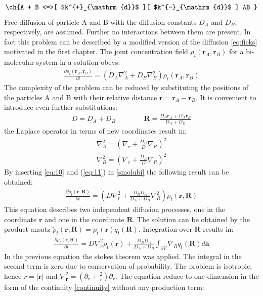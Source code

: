 \documentclass[
  a4paper,BCOR10mm,oneside,
  headsepline,footsepline,%
  fleqn,openbib
]{scrbook}
\begin{document}
\begin{align}\label{reactionscemebi}
\text{\ch{A + B <=>[ $k^{+}_{\mathrm{d}}$ ][ $k^{-}_{\mathrm{d}}$ ] AB }}
\end{align}
Free diffusion of particle A and B with the diffusion constants $D_A$ and $D_B$, respectively, are assumed. Further no interactions between them are present. In fact this problem can be described by a modified version of the diffusion \cref{eq:ficks} motivated in the first chapter.
The joint concentration field $\rho_t(\bm{r}_A,\bm{r}_B)$ for a bi-molecular system in a solution obeys:
\begin{align}
 \frac{\partial \rho_t(\bm{r}_A,\bm{r}_B)}{\partial t}=(D_A \nabla^{2}_{A}+D_B \nabla^{2}_{B}) \rho_t(\bm{r}_A,\bm{r}_B) \label{smolubi}
\end{align}
The complexity of the problem can be reduced by substituting the positions of the particles A and B with their relative distance $\bm{r}=\bm{r}_A-\bm{r}_B$. It is convenient to introduce even further substitutions:
\begin{align}
 D= D_A+D_B \qquad \qquad \bm{R}=\frac{D_B \bm{r}_A+ D_A \bm{r}_B}{D_A+D_B}
\end{align}
the Laplace operator in terms of new coordinates result in:
\begin{align}
\nabla^{2}_{A} = \left( \nabla_r+\frac{D_B}{D} \nabla_R \right)^2 \label{eq:10}\\
\nabla^{2}_{B} = \left( \nabla_r+\frac{D_A}{D} \nabla_R \right)^2 \label{eq:11}
\end{align}
By inserting \cref{eq:10}  and (\ref{eq:11}) in \cref{smolubi} the following result can be obtained:
\begin{align}
 \frac{\partial \tilde{\rho}_t(\bm{r},\bm{R})}{\partial t}=\left(D \nabla^{2}_{r}+\frac{D_B D_A}{D_A+D_B}\nabla^{2}_{R}\right) \tilde{\rho}_t(\bm{r},\bm{R})
\end{align}
This equation describes two independent diffusion processes, one in the coordinate $\bm{r}$ and one in the coordinate $\bm{R}$. The solution can be obtained by the product ansatz $\tilde{\rho}_t(\bm{r},\bm{R})=\rho_t(\bm{r})q_t(\bm{R})$. Integration over $\bm{R}$ results in:
\begin{align}
\frac{\partial \tilde{\rho}_t(\bm{r},\bm{R})}{\partial t}=D \nabla^{2}_{r} \rho_t(\bm{r}) +\frac{D_B D_A}{D_A+D_B}   \int_{\partial V} \nabla_{R} q_t(\bm{R}) d \bm{a}
\end{align}
In the previous equation the stokes theorem was applied. The integral in the second term is zero due to conservation of probability. The problem is isotropic, hence $r=|\bm{r}|$ and $\nabla^{2}_{\bm{r}}=\left(\partial_r+\frac{2}{r}\right)\partial_r$. The equation reduce to one dimension in the form of the continuity \cref{continuity} without any production term:
\end{document}
